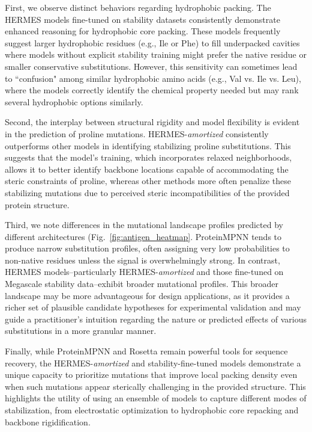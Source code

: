 First, we observe distinct behaviors regarding hydrophobic packing. The HERMES models fine-tuned on
stability datasets consistently demonstrate enhanced reasoning for hydrophobic core packing. These
models frequently suggest larger hydrophobic residues (e.g., Ile or Phe) to fill underpacked
cavities where models without explicit stability training might prefer the native residue or smaller
conservative substitutions. However, this sensitivity can sometimes lead to ``confusion" among
similar hydrophobic amino acids (e.g., Val vs. Ile vs. Leu), where the models correctly identify the
chemical property needed but may rank several hydrophobic options similarly.

Second, the interplay between structural rigidity and model flexibility is evident in the prediction
of proline mutations. HERMES-\textit{amortized} consistently outperforms other models in identifying
stabilizing proline substitutions. This suggests that the model's training, which incorporates
relaxed neighborhoods, allows it to better identify backbone locations capable of accommodating the
steric constraints of proline, whereas other methods more often penalize these stabilizing mutations
due to perceived steric incompatibilities of the provided protein structure.

Third, we note differences in the mutational landscape profiles predicted by different architectures
(Fig.~\ref{fig:antigen_heatmap}. ProteinMPNN tends to produce narrow substitution profiles, often
assigning very low probabilities to non-native residues unless the signal is overwhelmingly strong.
In contrast, HERMES models--particularly HERMES-\textit{amortized} and those fine-tuned on Megascale
stability data--exhibit broader mutational profiles. This broader landscape may be more advantageous
for design applications, as it provides a richer set of plausible candidate hypotheses for
experimental validation and may guide a practitioner's intuition regarding the nature or predicted
effects of various substitutions in a more granular manner.

Finally, while ProteinMPNN and Rosetta remain powerful tools for sequence recovery, the
HERMES-\textit{amortized} and stability-fine-tuned models demonstrate a unique capacity to
prioritize mutations that improve local packing density even when such mutations appear sterically
challenging in the provided structure. This highlights the utility of using an ensemble of models to
capture different modes of stabilization, from electrostatic optimization to hydrophobic core
repacking and backbone rigidification.


